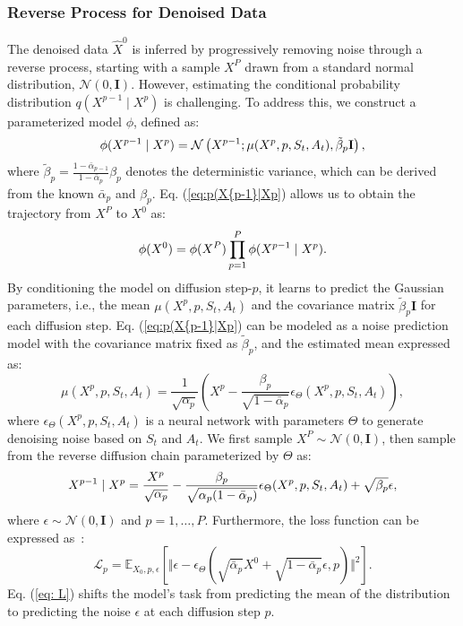 \documentclass[comsoc,journal]{IEEEtran}
\begin{document}
\subsubsection{Reverse Process for Denoised Data}
The denoised data $\hat{X}^{0}$ is inferred by progressively removing noise through a reverse process, starting with a sample $X^P$ drawn from a standard normal distribution, $\mathcal{N}(0, \mathbf{I})$. However, estimating the conditional probability distribution $q(X^{p-1} \mid X^p)$ is challenging. To address this, we construct a parameterized model $\phi$, defined as: \begin{equation}\label{eq:p(X{p-1}|Xp} 
\phi(X^{p-1} \mid X^p) = \mathcal{N}\left( X^{p-1}; \mu(X^p, p, S_t, A_t), \tilde{\beta}_p \mathbf{I} \right), 
\end{equation} 
where $\tilde{\beta}_p = \frac{1 - \bar{\alpha}_{p-1}}{1 - \bar{\alpha}_p} \beta_p$ denotes the deterministic variance, which can be derived from the known $\bar{\alpha}_p$ and $\beta_p$. Eq. (\ref{eq:p(X{p-1}|Xp}) allows us to obtain the trajectory from $X^P$ to $X^0$ as: 
\begin{equation} \label{eq:p{X0}}
\phi(X^0) = \phi(X^P)\prod_{p=1}^{P} \phi(X^{p-1} \mid X^p). 
\end{equation} 
By conditioning the model on diffusion step-$p$, it learns to predict the Gaussian parameters, i.e., the mean $\mu(X^p, p, S_t, A_t)$ and the covariance matrix $\tilde{\beta}_p \mathbf{I}$ for each diffusion step. Eq. (\ref{eq:p(X{p-1}|Xp}) can be modeled as a noise prediction model with the covariance matrix fixed as $\tilde{\beta}_p$, and
the estimated mean expressed as:
\begin{equation} \label{eq:mu}
\mu(X^p, p, S_t, A_t) = \frac{1}{\sqrt{\alpha_p}} \left( X^p - \frac{\beta_p}{\sqrt{1 - \bar{\alpha}_p}} \epsilon_{\Theta}(X^p, p, S_t, A_t) \right), \end{equation} 
where $\epsilon_{\Theta}(X^p, p, S_t, A_t)$ is a neural network with parameters $\Theta$ to generate denoising noise based on $S_t$ and $A_t$. 
We first sample ${X}^P \sim \mathcal{N}(0, \mathbf{I})$, then sample from the reverse diffusion chain parameterized by $\Theta$ as: 
\begin{equation} \label{X{p-1}|Xp}
X^{p-1} \mid X^p = \frac{X^p}{\sqrt{\alpha_p}} - \frac{\beta_p}{\sqrt{\alpha_p(1 - \bar{\alpha}_p)}} \epsilon_{\Theta}(X^p, p, S_t, A_t) + \sqrt{\beta_p} \epsilon, 
\end{equation} 
where $\epsilon \sim \mathcal{N}(0, \mathbf{I})$ and $p = 1, \ldots, P$. Furthermore, the loss function can be expressed as~\cite{du2024enhancing}:
\begin{equation} \label{eq: L}
\mathcal{L}_p = \mathbb{E}_{{X}_0, p, \epsilon} \left[ \Vert\epsilon - \epsilon_{\Theta} \left( \sqrt{\bar{\alpha}_p} {X}^0 + \sqrt{1 - \bar{\alpha}_p} \epsilon, p \right) \Vert^2 \right]. 
\end{equation} 
Eq. (\ref{eq: L}) shifts the model's task from predicting the mean of the distribution to predicting the noise $\epsilon$ at each diffusion step $p$.
\vspace{-6pt}
\end{document}
